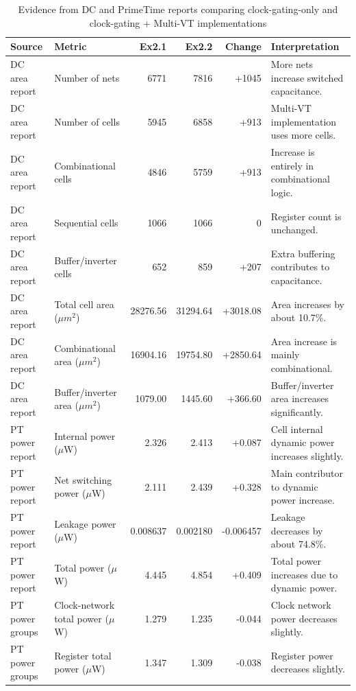 \documentclass[11pt,a4paper]{article}
\begin{document}
\begin{table}[h]
\centering
\scriptsize
\setlength{\tabcolsep}{3pt}
\renewcommand{\arraystretch}{1.15}
\caption{Evidence from DC and PrimeTime reports comparing clock-gating-only and clock-gating + Multi-VT implementations}
\begin{tabularx}{\textwidth}{llrrrX}
\toprule
\textbf{Source} & \textbf{Metric} & \textbf{Ex2.1} & \textbf{Ex2.2} & \textbf{Change} & \textbf{Interpretation} \\
\midrule
DC area report & Number of nets & 6771 & 7816 & +1045 & More nets increase switched capacitance. \\
DC area report & Number of cells & 5945 & 6858 & +913 & Multi-VT implementation uses more cells. \\
DC area report & Combinational cells & 4846 & 5759 & +913 & Increase is entirely in combinational logic. \\
DC area report & Sequential cells & 1066 & 1066 & 0 & Register count is unchanged. \\
DC area report & Buffer/inverter cells & 652 & 859 & +207 & Extra buffering contributes to capacitance. \\
DC area report & Total cell area ($\mu m^2$) & 28276.56 & 31294.64 & +3018.08 & Area increases by about 10.7\%. \\
DC area report & Combinational area ($\mu m^2$) & 16904.16 & 19754.80 & +2850.64 & Area increase is mainly combinational. \\
DC area report & Buffer/inverter area ($\mu m^2$) & 1079.00 & 1445.60 & +366.60 & Buffer/inverter area increases significantly. \\
\midrule
PT power report & Internal power ($\mu$W) & 2.326 & 2.413 & +0.087 & Cell internal dynamic power increases slightly. \\
PT power report & Net switching power ($\mu$W) & 2.111 & 2.439 & +0.328 & Main contributor to dynamic power increase. \\
PT power report & Leakage power ($\mu$W) & 0.008637 & 0.002180 & -0.006457 & Leakage decreases by about 74.8\%. \\
PT power report & Total power ($\mu$W) & 4.445 & 4.854 & +0.409 & Total power increases due to dynamic power. \\
\midrule
PT power groups & Clock-network total power ($\mu$W) & 1.279 & 1.235 & -0.044 & Clock network power decreases slightly. \\
PT power groups & Register total power ($\mu$W) & 1.347 & 1.309 & -0.038 & Register power decreases slightly. \\

\end{tabularx}
\end{table}
\end{document}
